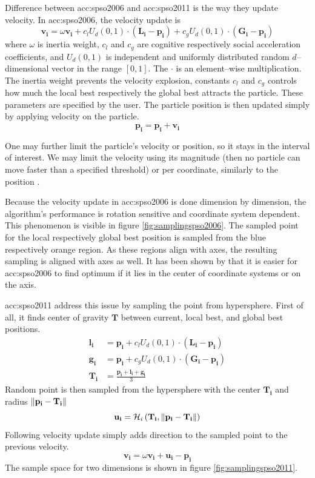 Difference between \acrshort{acc:spso2006} and \acrshort{acc:spso2011} is the way they update velocity. In \acrshort{acc:spso2006}, the velocity update is
$$
\mathbf{v_i} = \omega\mathbf{v_i} 
+ c_l U_d\left( 0,1 \right) \cdot \left( \mathbf{L_i} - \mathbf{p_i} \right)
+ c_g U_d\left( 0,1 \right) \cdot \left( \mathbf{G_i} - \mathbf{p_i} \right)
$$ 
where $\omega$ is inertia weight, $c_l$ and $c_g$ are cognitive respectively social acceleration coefficients, and $U_d(0,1)$ is independent and uniformly distributed random $d$--dimensional vector in the range $\left[ 0,1 \right]$. The $\cdot$ is an element--wise multiplication. The inertia weight prevents the velocity explosion, constants $c_l$ and $c_g$ controls how much the local best respectively the global best attracts the particle. These parameters are specified by the user. The particle position is then updated simply by applying velocity on the particle.
$$
\mathbf{p_i} = \mathbf{p_i} + \mathbf{v_i}
$$

One may further limit the particle's velocity or position, so it stays in the interval of interest. We may limit the velocity using its magnitude (then no particle can move faster than a specified threshold) or per coordinate, similarly to the position \citep{PSOvelocitylimit}.

Because the velocity update in \acrshort{acc:spso2006} is done dimension by dimension, the algorithm's performance is rotation sensitive and coordinate system dependent. This phenomenon is visible in figure \ref{fig:samplingspso2006}. The sampled point for the local respectively global best position is sampled from the blue respectively orange region. As these regions align with axes, the resulting sampling is aligned with axes as well. It has been shown by \citet{psobiasinzero} that it is easier for \acrshort{acc:spso2006} to find optimum if it lies in the center of coordinate systems or on the axis.

\acrshort{acc:spso2011} address this issue by sampling the point from hypersphere. First of all, it finds center of gravity $\mathbf{T}$ between current, local best, and global best positions.
\begin{align*}
    \mathbf{l_i} &= \mathbf{p_i} + c_l U_d\left( 0,1 \right) \cdot \left( \mathbf{L_i} - \mathbf{p_i} \right) \\
    \mathbf{g_i} &= \mathbf{p_i} + c_g U_d\left( 0,1 \right) \cdot \left( \mathbf{G_i} - \mathbf{p_i} \right) \\
    \mathbf{T_i} &= \frac{\mathbf{p_i}+\mathbf{l_i}+\mathbf{g_i}}{3}
\end{align*}
Random point is then sampled from the hypersphere with the center $\mathbf{T_i}$ and radius $\left\lVert\mathbf{p_i} - \mathbf{T_i}\right\rVert$
$$
\mathbf{u_i} = \mathcal{H}_i\left(\mathbf{T_i}, \left\lVert\mathbf{p_i} - \mathbf{T_i}\right\rVert\right)
$$
Following velocity update simply adds direction to the sampled point to the previous velocity.
$$
\mathbf{v_i} = \omega\mathbf{v_i}+\mathbf{u_i}-\mathbf{p_i}
$$
The sample space for two dimensions is shown in figure \ref{fig:samplingspso2011}.

